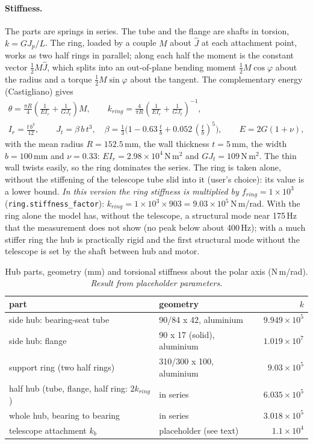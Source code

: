 \documentclass[10pt,a4paper]{article}
\numberwithin{equation}{section}
\begin{document}
\paragraph{Stiffness.} The parts are springs in series. The tube and the flange are shafts in torsion, $k = G J_p/L$. The ring, loaded by a couple $M$ about $\hat J$ at each attachment point, works as two half rings in parallel; along each half the moment is the constant vector $\tfrac12 M\hat J$, which splits into an out-of-plane bending moment $\tfrac12 M\cos\varphi$ about the radius and a torque $\tfrac12 M\sin\varphi$ about the tangent. The complementary energy (Castigliano) gives
\begin{gather}
\theta = \frac{\pi R}{4}\left(\frac{1}{E I_r} + \frac{1}{G J_t}\right) M,\qquad k_{ring} = \frac{4}{\pi R}\left(\frac{1}{E I_r} + \frac{1}{G J_t}\right)^{-1},\\
I_r = \frac{t\,b^3}{12},\qquad J_t = \beta\,b\,t^3,\quad \beta = \tfrac13\bigl(1 - 0.63\,\tfrac tb + 0.052\,(\tfrac tb)^5\bigr),\qquad E = 2G(1 + \nu),
\end{gather}
with the mean radius $R = 152.5$\,mm, the wall thickness $t = 5$\,mm, the width $b = 100$\,mm and $\nu = 0.33$: $E I_r = 2.98\times10^{4}$\,N\,m$^2$ and $G J_t = 109$\,N\,m$^2$. The thin wall twists easily, so the ring dominates the series. The ring is taken alone, without the stiffening of the telescope tube slid into it (user's choice): its value is a lower bound. \emph{In this version the ring stiffness is multiplied by $f_{ring} = 1\times10^{3}$} (\texttt{ring.stiffness\_factor}): $k_{ring} = 1\times10^{3} \times 903 = 9.03\times10^{5}$\,N\,m/rad. With the ring alone the model has, without the telescope, a structural mode near 175\,Hz that the measurement does not show (no peak below about 400\,Hz); with a much stiffer ring the hub is practically rigid and the first structural mode without the telescope is set by the shaft between hub and motor.
\begin{table}[H]\centering\small
\caption{Hub parts, geometry (mm) and torsional stiffness about the polar axis (N\,m/rad). \emph{Result from placeholder parameters.}}\label{tab:hub_parts}
\begin{tabular}{llr}\toprule
part & geometry & $k$ \\ \midrule
side hub: bearing-seat tube & 90/84 x 42, aluminium & $9.949\times10^{5}$ \\
side hub: flange & 90 x 17 (solid), aluminium & $1.019\times10^{7}$ \\
support ring (two half rings) & 310/300 x 100, aluminium & $9.03\times10^{5}$ \\
\midrule
half hub (tube, flange, half ring: $2k_{ring}$) & in series & $6.035\times10^{5}$ \\
whole hub, bearing to bearing & in series & $3.018\times10^{5}$ \\
telescope attachment $k_b$ & placeholder (see text) & $1.1\times10^{4}$ \\
\bottomrule\end{tabular}\end{table}
\end{document}
